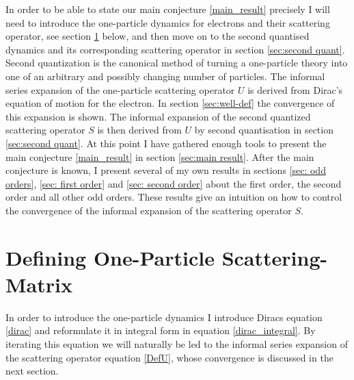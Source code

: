 \documentclass[b5paper,draft,openbib,12pt]{memoir}
\begin{document}
In order to be able to state our main conjecture \eqref{main_result} precisely
I will need to introduce the one-particle dynamics for electrons and their
scattering operator, see section \ref{sec:one-particle} below, and then move on
to the second quantised dynamics and its corresponding scattering operator  in
section \ref{sec:second quant}. Second quantization is the canonical
method of turning a one-particle theory into one of an arbitrary and
possibly changing number of particles. The informal
series expansion of the one-particle scattering operator \(U\) is derived 
from Dirac's equation of motion for the electron. In section
 \ref{sec:well-def} the convergence of this
expansion is shown. The informal expansion of the second quantized
scattering operator $S$ is then derived from $U$ by second quantisation in
section \ref{sec:second quant}. At this point I have gathered enough tools to present the main conjecture \ref{main_result} in section \ref{sec:main result}. 
After the main conjecture is known, I present several of my own results in sections \ref{sec: odd orders}, \ref{sec: first order} and \ref{sec: second order} about the first order, the second order and all other odd orders. 
These results give an intuition on how to control the convergence of the informal expansion of the scattering operator \(S\).



\section{Defining One-Particle Scattering-Matrix}\label{sec:one-particle}


In order to introduce the one-particle dynamics I introduce Diracs equation \eqref{dirac} and reformulate it in integral form in equation \eqref{dirac_integral}. By iterating this equation we will naturally be led to the informal series expansion of the scattering operator equation \eqref{DefU}, whose convergence is discussed in the next section. 
\end{document}
